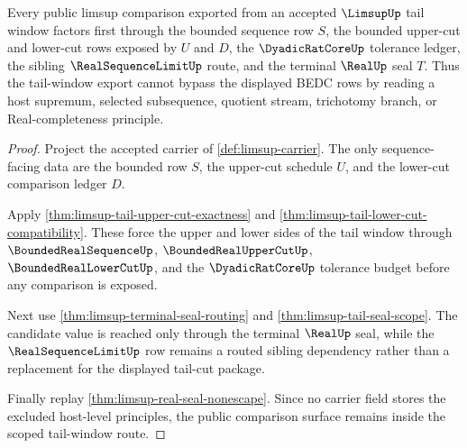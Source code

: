 \begin{theorem}
\label{thm:limsup-tail-window-nonescape}
Every public limsup comparison exported from an accepted $\LimsupUp$ tail window factors first through the bounded sequence row $S$, the bounded upper-cut and lower-cut rows exposed by $U$ and $D$, the $\DyadicRatCoreUp$ tolerance ledger, the sibling $\RealSequenceLimitUp$ route, and the terminal $\RealUp$ seal $T$. Thus the tail-window export cannot bypass the displayed BEDC rows by reading a host supremum, selected subsequence, quotient stream, trichotomy branch, or Real-completeness principle.
\end{theorem}
\begin{proof}
Project the accepted carrier of \autoref{def:limsup-carrier}. The only sequence-facing data are the bounded row $S$, the upper-cut schedule $U$, and the lower-cut comparison ledger $D$.

Apply \autoref{thm:limsup-tail-upper-cut-exactness} and \autoref{thm:limsup-tail-lower-cut-compatibility}. These force the upper and lower sides of the tail window through $\BoundedRealSequenceUp$, $\BoundedRealUpperCutUp$, $\BoundedRealLowerCutUp$, and the $\DyadicRatCoreUp$ tolerance budget before any comparison is exposed.

Next use \autoref{thm:limsup-terminal-seal-routing} and \autoref{thm:limsup-tail-seal-scope}. The candidate value is reached only through the terminal $\RealUp$ seal, while the $\RealSequenceLimitUp$ row remains a routed sibling dependency rather than a replacement for the displayed tail-cut package.

Finally replay \autoref{thm:limsup-real-seal-nonescape}. Since no carrier field stores the excluded host-level principles, the public comparison surface remains inside the scoped tail-window route.
\end{proof}

